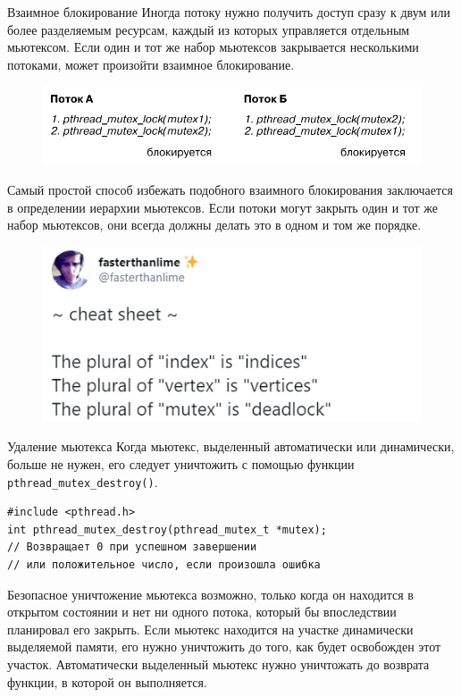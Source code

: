 \documentclass{beamer}
\begin{document}
\begin{frame}{Взаимное блокирование}
    Иногда потоку нужно получить доступ сразу к двум или более разделяемым ресурсам, каждый из которых управляется отдельным мьютексом. Если один и тот же набор мьютексов закрывается несколькими потоками, может произойти взаимное блокирование.
    
    \begin{figure}[h]
        \centering
        \includegraphics[scale=0.6]{deadlock.png}
    \end{figure}

    Самый простой способ избежать подобного взаимного блокирования заключается в определении иерархии мьютексов. Если потоки могут закрыть один и тот же набор мьютексов, они всегда должны делать это в одном и том же порядке. 
\end{frame}

\begin{frame}{}
    \begin{figure}
        \centering
        \includegraphics[scale=0.8]{mutexes.png}
    \end{figure}
\end{frame}

\begin{frame}[fragile]{Удаление мьютекса}
    Когда мьютекс, выделенный автоматически или динамически, больше не нужен, его следует уничтожить с помощью функции \texttt{pthread\_mutex\_destroy()}. 
    
    \begin{verbatim}
#include <pthread.h>
int pthread_mutex_destroy(pthread_mutex_t *mutex);
// Возвращает 0 при успешном завершении
// или положительное число, если произошла ошибка
    \end{verbatim}
    
    Безопасное уничтожение мьютекса возможно, только когда он находится в открытом состоянии и нет ни одного потока, который бы впоследствии планировал его закрыть. Если мьютекс находится на участке динамически выделяемой памяти, его нужно уничтожить до того, как будет освобожден этот участок. Автоматически выделенный мьютекс нужно уничтожать до возврата функции, в которой он выполняется.
\end{frame}
\end{document}
